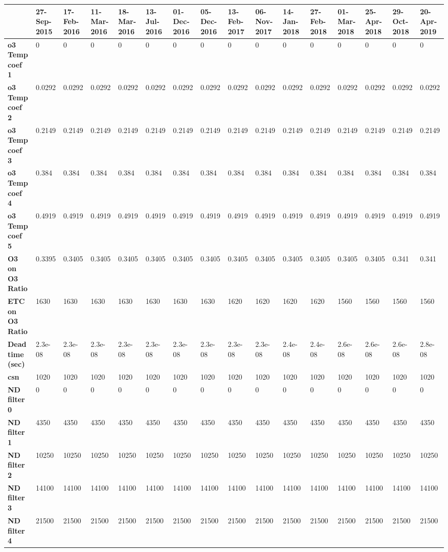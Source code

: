 \begin{footnotesize}\begin{longtable}{|l|l|l|l|l|l|l|l|l|l|l|l|l|l|l|l|}
\hline
&\textbf{27-Sep-2015}&\textbf{17-Feb-2016}&\textbf{11-Mar-2016}&\textbf{18-Mar-2016}&\textbf{13-Jul-2016}&\textbf{01-Dec-2016}&\textbf{05-Dec-2016}&\textbf{13-Feb-2017}&\textbf{06-Nov-2017}&\textbf{14-Jan-2018}&\textbf{27-Feb-2018}&\textbf{01-Mar-2018}&\textbf{25-Apr-2018}&\textbf{29-Oct-2018}&\textbf{20-Apr-2019}\\\hline
\textbf{o3 Temp coef 1}&0&0&0&0&0&0&0&0&0&0&0&0&0&0&0\\\hline
\textbf{o3 Temp coef 2}&0.0292&0.0292&0.0292&0.0292&0.0292&0.0292&0.0292&0.0292&0.0292&0.0292&0.0292&0.0292&0.0292&0.0292&0.0292\\\hline
\textbf{o3 Temp coef 3}&0.2149&0.2149&0.2149&0.2149&0.2149&0.2149&0.2149&0.2149&0.2149&0.2149&0.2149&0.2149&0.2149&0.2149&0.2149\\\hline
\textbf{o3 Temp coef 4}&0.384&0.384&0.384&0.384&0.384&0.384&0.384&0.384&0.384&0.384&0.384&0.384&0.384&0.384&0.384\\\hline
\textbf{o3 Temp coef 5}&0.4919&0.4919&0.4919&0.4919&0.4919&0.4919&0.4919&0.4919&0.4919&0.4919&0.4919&0.4919&0.4919&0.4919&0.4919\\\hline
\textbf{O3 on O3 Ratio}&0.3395&0.3405&0.3405&0.3405&0.3405&0.3405&0.3405&0.3405&0.3405&0.3405&0.3405&0.3405&0.3405&0.341&0.341\\\hline
\textbf{ETC on O3 Ratio}&1630&1630&1630&1630&1630&1630&1630&1620&1620&1620&1620&1560&1560&1560&1560\\\hline
\textbf{Dead time (sec)}&2.3e-08&2.3e-08&2.3e-08&2.3e-08&2.3e-08&2.3e-08&2.3e-08&2.3e-08&2.3e-08&2.4e-08&2.4e-08&2.6e-08&2.6e-08&2.6e-08&2.8e-08\\\hline
\textbf{csn}&1020&1020&1020&1020&1020&1020&1020&1020&1020&1020&1020&1020&1020&1020&1020\\\hline
\textbf{ND filter 0}&0&0&0&0&0&0&0&0&0&0&0&0&0&0&0\\\hline
\textbf{ND filter 1}&4350&4350&4350&4350&4350&4350&4350&4350&4350&4350&4350&4350&4350&4350&4350\\\hline
\textbf{ND filter 2}&10250&10250&10250&10250&10250&10250&10250&10250&10250&10250&10250&10250&10250&10250&10250\\\hline
\textbf{ND filter 3}&14100&14100&14100&14100&14100&14100&14100&14100&14100&14100&14100&14100&14100&14100&14100\\\hline
\textbf{ND filter 4}&21500&21500&21500&21500&21500&21500&21500&21500&21500&21500&21500&21500&21500&21500&21500\\\hline

\end{longtable}
\end{footnotesize}
